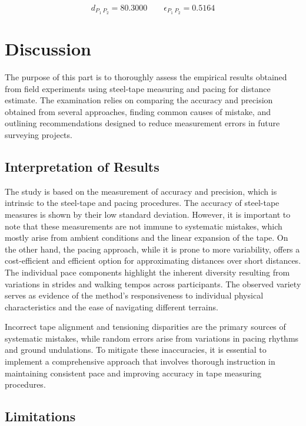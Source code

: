 \documentclass[12pt]{article}
\begin{document}
$$\boxed{d_{P_1 \ P_2} = 80.3000} \qquad \boxed{\epsilon_{P_1 \ P_2} = 0.5164}$$

\newpage
\section*{Discussion}

The purpose of this part is to thoroughly assess the empirical results obtained from field experiments using steel-tape measuring and pacing for distance estimate. The examination relies on comparing the accuracy and precision obtained from several approaches, finding common causes of mistake, and outlining recommendations designed to reduce measurement errors in future surveying projects.

\subsection*{Interpretation of Results}

The study is based on the measurement of accuracy and precision, which is intrinsic to the steel-tape and pacing procedures. The accuracy of steel-tape measures is shown by their low standard deviation. However, it is important to note that these measurements are not immune to systematic mistakes, which mostly arise from ambient conditions and the linear expansion of the tape. On the other hand, the pacing approach, while it is prone to more variability, offers a cost-efficient and efficient option for approximating distances over short distances. The individual pace components highlight the inherent diversity resulting from variations in strides and walking tempos across participants. The observed variety serves as evidence of the method's responsiveness to individual physical characteristics and the ease of navigating different terrains.

Incorrect tape alignment and tensioning disparities are the primary sources of systematic mistakes, while random errors arise from variations in pacing rhythms and ground undulations. To mitigate these inaccuracies, it is essential to implement a comprehensive approach that involves thorough instruction in maintaining consistent pace and improving accuracy in tape measuring procedures.

\subsection*{Limitations}
\end{document}
